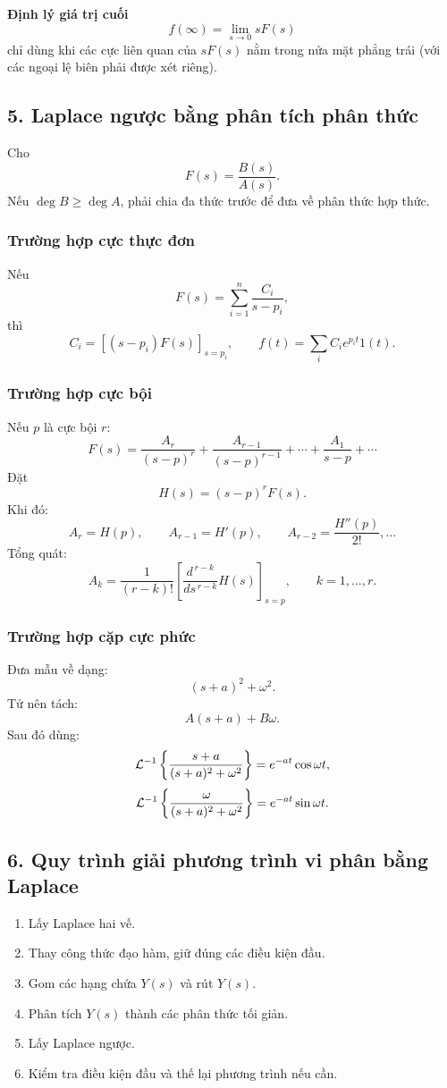 \textbf{Định lý giá trị cuối}
\[
\boxed{f(\infty)=\lim_{s\to0}sF(s)}
\]
chỉ dùng khi các cực liên quan của $sF(s)$ nằm trong nửa mặt phẳng trái
(với các ngoại lệ biên phải được xét riêng).

\subsection*{5. Laplace ngược bằng phân tích phân thức}

Cho
\[
F(s)=\frac{B(s)}{A(s)}.
\]
Nếu $\deg B\ge\deg A$, phải chia đa thức trước để đưa về phân thức hợp thức.

\subsubsection*{Trường hợp cực thực đơn}

Nếu
\[
F(s)=\sum_{i=1}^{n}\frac{C_i}{s-p_i},
\]
thì
\[
\boxed{C_i=\left[(s-p_i)F(s)\right]_{s=p_i}},
\qquad
f(t)=\sum_i C_ie^{p_it}1(t).
\]

\subsubsection*{Trường hợp cực bội}

Nếu $p$ là cực bội $r$:
\[
F(s)=\frac{A_r}{(s-p)^r}+\frac{A_{r-1}}{(s-p)^{r-1}}
+\cdots+\frac{A_1}{s-p}+\cdots
\]
Đặt
\[
H(s)=(s-p)^rF(s).
\]
Khi đó:
\[
A_r=H(p),\qquad
A_{r-1}=H'(p),\qquad
A_{r-2}=\frac{H''(p)}{2!},\ldots
\]
Tổng quát:
\[
\boxed{
A_k=
\frac{1}{(r-k)!}
\left[
\frac{d^{\,r-k}}{ds^{\,r-k}}H(s)
\right]_{s=p},
\qquad k=1,\ldots,r.
}
\]

\subsubsection*{Trường hợp cặp cực phức}

Đưa mẫu về dạng:
\[
(s+a)^2+\omega^2.
\]
Tử nên tách:
\[
A(s+a)+B\omega.
\]
Sau đó dùng:
\[
\mathcal{L}^{-1}\left\{\frac{s+a}{(s+a)^2+\omega^2}\right\}
=e^{-at}\cos\omega t,
\]
\[
\mathcal{L}^{-1}\left\{\frac{\omega}{(s+a)^2+\omega^2}\right\}
=e^{-at}\sin\omega t.
\]

\subsection*{6. Quy trình giải phương trình vi phân bằng Laplace}

\begin{enumerate}[leftmargin=1.9em,itemsep=0.2em]
  \item Lấy Laplace hai vế.
  \item Thay công thức đạo hàm, giữ đúng các điều kiện đầu.
  \item Gom các hạng chứa $Y(s)$ và rút $Y(s)$.
  \item Phân tích $Y(s)$ thành các phân thức tối giản.
  \item Lấy Laplace ngược.
  \item Kiểm tra điều kiện đầu và thế lại phương trình nếu cần.
\end{enumerate}

